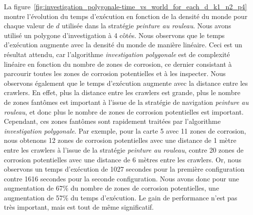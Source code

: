 \documentclass[francais,RandD]{rapportPFE}
\begin{document}
			La figure~\ref{fig:investigation_polygonale-time_vs_world_for_each_d_k1_n2_p4} montre l'évolution du temps d'exécution en fonction de la densité du monde pour chaque valeur de $d$ utilisée dans la stratégie \textit{peinture au rouleau}.
			Nous avons utilisé un polygone d'investigation à 4 côtés.
			Nous observons que le temps d'exécution augmente avec la densité du monde de manière linéaire.
			Ceci est un résultat attendu, car l'algorithme \textit{investigation polygonale} est de complexité linéaire en fonction du nombre de zones de corrosion, ce dernier consistant à parcourir toutes les zones de corrosion potentielles et à les inspecter.
			Nous observons également que le temps d'exécution augmente avec la distance entre les crawlers.
			En effet, plus la distance entre les crawlers est grande, plus le nombre de zones fantômes est important à l'issue de la stratégie de navigation \textit{peinture au rouleau}, et donc plus le nombre de zones de corrosion potentielles est important.
			Cependant, ces zones fantômes sont rapidement traitées par l'algorithme \textit{investigation polygonale}.
			Par exemple, pour la carte 5 avec 11 zones de corrosion, nous obtenons 12 zones de corrosion potentielles avec une distance de 1 mètre entre les crawlers à l'issue de la stratégie \textit{peinture au rouleau}, contre 20 zones de corrosion potentielles avec une distance de 6 mètres entre les crawlers.
			Or, nous observons un temps d'exécution de 1027 secondes pour la première configuration contre 1616 secondes pour la seconde configuration.
			Nous avons donc pour une augmentation de 67\% du nombre de zones de corrosion potentielles, une augmentation de 57\% du temps d'exécution.
			Le gain de performance n'est pas très important, mais est tout de même significatif.
\end{document}
